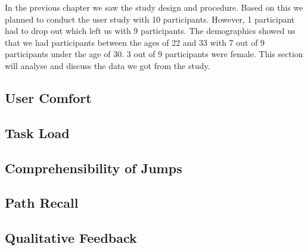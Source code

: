 \label{Chapter:Evaluation of the User Study}
In the previous chapter we saw the study design and procedure. Based on this we planned to conduct the user study with 10 participants. However, 1 participant had to drop out which left us with 9 participants. The demographics showed us that we had participants between the ages of 22 and 33 with 7 out of 9 participants under the age of 30. 3 out of 9 participants were female. This section will analyse and discuss the data we got from the study.

\subsection{User Comfort}
\label{subsection EUS: User Comfort}
\subsection{Task Load}
\label{subsection EUS: Task Load}
\subsection{Comprehensibility of Jumps}
\label{subsection EUS: Comprehensibility of Jumps}
\subsection{Path Recall}
\label{subsection EUS: Path Recall}
\subsection{Qualitative Feedback}
\label{subsection EUS: Qualitative Feedback}